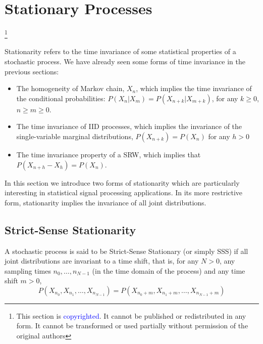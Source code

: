 

\section{Stationary Processes}
\footnote{This section is \textcolor{blue}{copyrighted}. It cannot be published or redistributed in any form. It cannot be transformed or used partially without permission of the original authors}

Stationarity refers to the time invariance of some statistical properties of a stochastic process. We have already seen some forms of time invariance in the previous sections: 

\begin{itemize}
\item The homogeneity of Markov chain, $X_n$, which implies the time invariance of the conditional probabilities: $P(X_n|X_m) = P(X_{n+k}|X_{m+k})$, for any $k \ge 0$, $n \ge m \ge 0$. 
\item The time invariance of IID processes, which implies the invariance of the single-variable marginal distributions, $P(X_{n+k}) = P(X_n)$ for any $h>0$
\item The time invariance property of a SRW, which implies that $P(X_{n+h}-X_h) = P(X_n)$.
\end{itemize}

In this section we introduce two forms of stationarity which are particularly interesting in statistical signal processing applications. In its more restrictive form, stationarity implies the invariance of all joint distributions.

\subsection{Strict-Sense Stationarity}
\label{sec:Stationarity}

\begin{definition}
A stochastic process is said to be Strict-Sense Stationary (or simply SSS) if all joint distributions are invariant to a time shift, that is, for any $N>0$, any sampling times $n_0, \ldots, n_{N-1}$ (in the time domain of the process) and any time shift $m > 0$, 
\begin{equation}
\label{ec:strict}
P(X_{n_0},X_{n_1}, \ldots, X_{n_{N-1}}) = P(X_{n_0 + m}, X_{n_1 +m}, \ldots, X_{n_{N-1}+m})
\end{equation}
\end{definition}

